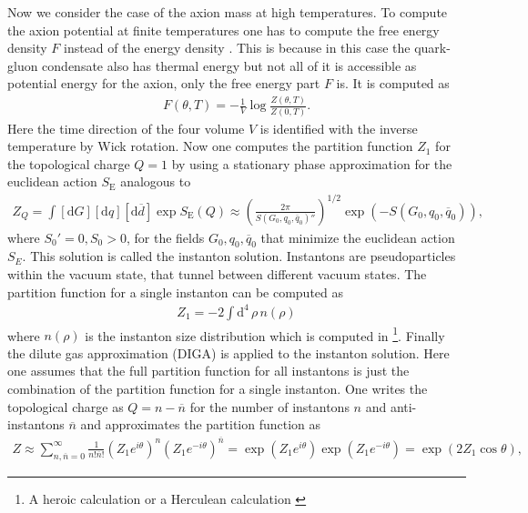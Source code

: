 \documentclass[twoside,a4paper, 12pt]{article}
\newcommand{\diff}{\mathrm{d}}
\numberwithin{equation}{section}
\begin{document}
Now we consider the case of the axion mass at high temperatures.
To compute the axion potential at finite temperatures one has to
compute the free energy density $F$ instead of the energy density \cite[Eq. 2.10]{FiniteTempQCD}.
This is because in this case the quark-gluon condensate also has thermal energy but not all of it is accessible as potential energy for the axion, only the free energy part $F$ is.
It is computed as 
\begin{align*}
    F(\theta, T) = - \frac{1}{V} \log \frac{Z(\theta, T)}{Z(0, T)}.
\end{align*}
Here the time direction of the four volume $V$ is identified with the inverse temperature by Wick rotation.
Now one computes the partition function $Z_1$ for the topological charge $Q = 1$ by using a stationary phase approximation for the euclidean action $S_\mathrm{E}$
analogous to
\begin{align*}
    Z_Q = \int [\diff G] [\diff q] [\diff \overline{d}] \exp S_\mathrm{E}(Q) \approx
    \left(  \frac{2 \pi}{S(G_0, q_0, \overline{q}_0)''}  \right)^{1/2} \exp \left( - S(G_0, q_0, \overline{q}_0) \right),
\end{align*}
where $S_0' = 0, S_0 > 0$,
for the fields $G_0, q_0, \overline{q}_0$ that minimize the euclidean action $S_E$. This solution is called the instanton solution.
Instantons are pseudoparticles within the vacuum state, that tunnel between different vacuum states.
The partition function for a single instanton can be computed as \cite[Sec. VI]{FiniteTempQCD}
\begin{align*}
    Z_1 = -2 \int \diff^4 \, \rho \, n(\rho)
\end{align*}
where $n(\rho)$ is the instanton size distribution
which is computed in \cite{thooft_PhysRevD.14.3432} \footnote{A heroic calculation or a Herculean calculation \cite[Page 346]{Instantons}}.
Finally the dilute gas approximation (DIGA) is applied to the instanton solution. 
Here one assumes that the full partition function for all instantons is just the combination of 
the partition function for a single instanton.
One writes the topological charge as $Q = n - \overline{n}$ for the number of instantons
$n$ and anti-instantons $\overline{n}$ and approximates the partition function as
\cite[Chap. 7, Eq. 3.55]{Symmetry}
\begin{align*}
    Z \approx \sum_{n,\overline{n} = 0}^\infty \frac{1}{n! \overline{n}!} \left(Z_1 e^{i \theta}\right)^n \left(Z_1 e^{- i \theta}\right)^{\overline{n}}
    = \exp \left( Z_1 e^{i \theta} \right) \exp \left( Z_1 e^{- i \theta} \right) = \exp (2 Z_1 \cos \theta),
\end{align*}
\end{document}
